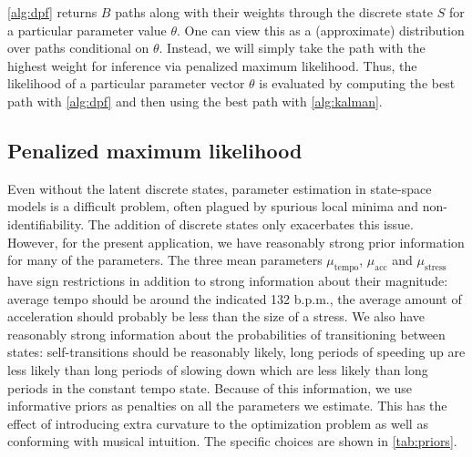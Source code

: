 \documentclass[12pt]{article}
\begin{document}
\autoref{alg:dpf} returns $B$ paths along with their weights through
the discrete state $S$ for a 
particular parameter value $\theta$. One
can view this as a (approximate) distribution over paths conditional
on $\theta$. Instead, we will simply take the path with the highest
weight for inference via penalized maximum likelihood. Thus, the
likelihood of a particular parameter vector $\theta$ is evaluated by
computing the best path with \autoref{alg:dpf} and then using the best
path with \autoref{alg:kalman}.

\subsection{Penalized maximum likelihood}
\label{sec:penal-maxim-likel}

Even without the latent discrete states, parameter estimation in
state-space models is a difficult problem, often plagued by spurious
local minima and non-identifiability. The addition of discrete states
only exacerbates this issue. However, for the present application, we
have reasonably strong prior information for many of the
parameters. The three mean parameters $\mu_{\textrm{tempo}}$,
$\mu_{\textrm{acc}}$ and $\mu_{\textrm{stress}}$ have sign
restrictions in addition to strong information about their magnitude:
average tempo should be around the indicated 132 b.p.m., the average
amount of acceleration should probably be less than the size of a
stress. We also have reasonably strong information about the
probabilities of transitioning between states: self-transitions should
be reasonably likely, long periods of speeding up are less likely than
long periods of slowing down which are less likely than long periods
in the constant tempo state. Because of this information, we use
informative priors as penalties on all the parameters we
estimate. This has the effect of introducing extra curvature to the
optimization problem as well as conforming with musical intuition. The
specific choices are shown in \autoref{tab:priors}. 
\end{document}
